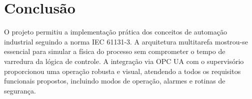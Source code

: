 \section{Conclusão}\label{sec:conclusao}

O projeto permitiu a implementação prática dos conceitos de automação industrial seguindo a norma IEC 61131-3. A arquitetura multitarefa mostrou-se essencial para simular a física do processo sem comprometer o tempo de varredura da lógica de controle. A integração via OPC UA com o supervisório proporcionou uma operação robusta e visual, atendendo a todos os requisitos funcionais propostos, incluindo modos de operação, alarmes e rotinas de segurança.